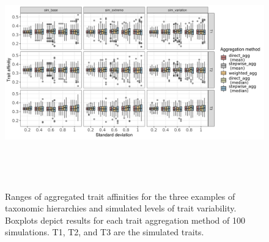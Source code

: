 \documentclass{article}
\begin{document}
\begin{figure}[H]
  \centering
  \includegraphics[width=16.5cm, height=10cm]{Overview_sim_results.png}
  \caption{Ranges of aggregated trait affinities for the three examples of taxonomic hierarchies and simulated levels of trait variability. Boxplots depict results for each trait aggregation method of 100 simulations. T1, T2, and T3 are the simulated traits.}
  \label{fig:overview_sim_results}
\end{figure}
\end{document}
